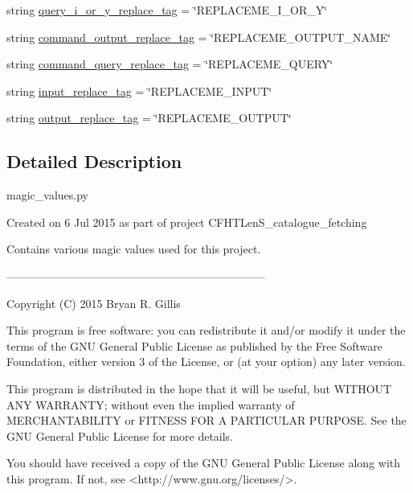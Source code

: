 \begin{DoxyCompactItemize}
\item 
string \hyperlink{namespaceCFHTLenS__Mag__fetching__data_1_1magic__values_ad7132d2537c4635bcbc48077bf4b8c63}{query\-\_\-i\-\_\-or\-\_\-y\-\_\-replace\-\_\-tag} = \char`\"{}R\-E\-P\-L\-A\-C\-E\-M\-E\-\_\-\-I\-\_\-\-O\-R\-\_\-\-Y\char`\"{}
\item 
string \hyperlink{namespaceCFHTLenS__Mag__fetching__data_1_1magic__values_aef60f791ed4f6f621b7dbe1762acd691}{command\-\_\-output\-\_\-replace\-\_\-tag} = \char`\"{}R\-E\-P\-L\-A\-C\-E\-M\-E\-\_\-\-O\-U\-T\-P\-U\-T\-\_\-\-N\-A\-M\-E\char`\"{}
\item 
string \hyperlink{namespaceCFHTLenS__Mag__fetching__data_1_1magic__values_ab1baa78799dd76e5885876c52eb169fb}{command\-\_\-query\-\_\-replace\-\_\-tag} = \char`\"{}R\-E\-P\-L\-A\-C\-E\-M\-E\-\_\-\-Q\-U\-E\-R\-Y\char`\"{}
\item 
string \hyperlink{namespaceCFHTLenS__Mag__fetching__data_1_1magic__values_afe4cede121b216e23e2f68fdff89fe0d}{input\-\_\-replace\-\_\-tag} = \char`\"{}R\-E\-P\-L\-A\-C\-E\-M\-E\-\_\-\-I\-N\-P\-U\-T\char`\"{}
\item 
string \hyperlink{namespaceCFHTLenS__Mag__fetching__data_1_1magic__values_a6c3644e92e83c59f6fd9c5087b0de75a}{output\-\_\-replace\-\_\-tag} = \char`\"{}R\-E\-P\-L\-A\-C\-E\-M\-E\-\_\-\-O\-U\-T\-P\-U\-T\char`\"{}
\end{DoxyCompactItemize}


\subsection{Detailed Description}
\begin{DoxyVerb}magic_values.py

Created on 6 Jul 2015 as part of project CFHTLenS_catalogue_fetching

Contains various magic values used for this project.

---------------------------------------------------------------------

Copyright (C) 2015  Bryan R. Gillis

This program is free software: you can redistribute it and/or modify
 it under the terms of the GNU General Public License as published by
 the Free Software Foundation, either version 3 of the License, or
 (at your option) any later version.

 This program is distributed in the hope that it will be useful,
 but WITHOUT ANY WARRANTY; without even the implied warranty of
 MERCHANTABILITY or FITNESS FOR A PARTICULAR PURPOSE.  See the
 GNU General Public License for more details.

You should have received a copy of the GNU General Public License
along with this program.  If not, see <http://www.gnu.org/licenses/>.\end{DoxyVerb}
 

